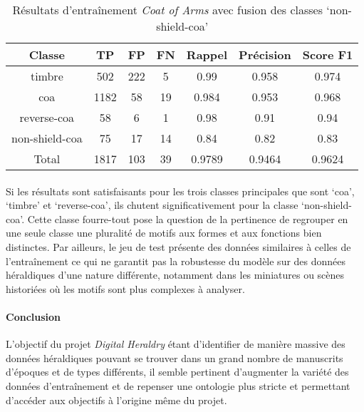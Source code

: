 \documentclass[12pt,twoside]{book}
\begin{document}
\begin{table}[ht]
    \centering
    \begin{tabular}{|c|c|c|c|c|c|c|}
    \hline
    \textbf{Classe} & \textbf{TP} & \textbf{FP} & \textbf{FN} & \textbf{Rappel} & \textbf{Précision} & \textbf{Score F1} \\
    \hline
    timbre & 502 & 222 & 5 & 0.99 & 0.958 & 0.974 \\ 
    \hline
    coa & 1182 & 58 & 19 & 0.984 & 0.953 & 0.968 \\ 
    \hline
    reverse-coa & 58 & 6 & 1 & 0.98 & 0.91 & 0.94 \\ 
    \hline
    non-shield-coa & 75 & 17 & 14 & 0.84 & 0.82 & 0.83 \\ 
    \hline
    Total & 1817 & 103 & 39 & 0.9789 & 0.9464 & 0.9624 \\
    \hline
    \end{tabular}
    \vspace{0.5cm}  %
    \caption{Résultats d'entraînement \textit{Coat of Arms} avec fusion des classes ‘non-shield-coa’}
\end{table}


\paragraph{}Si les résultats sont satisfaisants pour les trois classes principales que sont ‘coa’, ‘timbre’ et ‘reverse-coa’, ils chutent significativement pour la classe ‘non-shield-coa’.  Cette classe fourre-tout pose la question de la pertinence de regrouper en une seule classe une pluralité de motifs aux formes et aux fonctions bien distinctes. Par ailleurs, le jeu de test présente des données similaires à celles de l’entraînement ce qui ne garantit pas la robustesse du modèle sur des données héraldiques d’une nature différente, notamment dans les miniatures ou scènes historiées où les motifs sont plus complexes à analyser. \\

\paragraph{Conclusion} L’objectif du projet \textit{Digital Heraldry }étant d’identifier de manière massive des données héraldiques pouvant se trouver dans un grand nombre de manuscrits d’époques et de types différents, il semble pertinent d’augmenter la variété des données d’entraînement et de repenser une ontologie plus stricte et permettant d’accéder aux objectifs à l’origine même du projet. 
\end{document}
